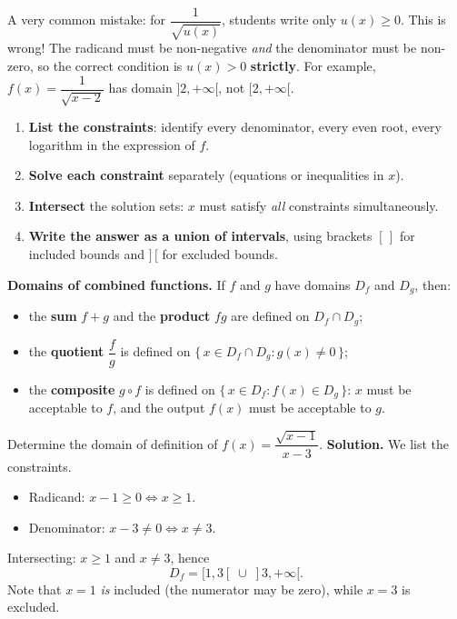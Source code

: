 \documentclass[11pt]{article}
\begin{document}
\begin{attention}
A very common mistake: for $\dfrac{1}{\sqrt{u(x)}}$, students write only $u(x) \geq 0$. This is wrong! The radicand must be non-negative \emph{and} the denominator must be non-zero, so the correct condition is $u(x) > 0$ \textbf{strictly}. For example, $f(x) = \dfrac{1}{\sqrt{x-2}}$ has domain $]2, +\infty[$, not $[2, +\infty[$.
\end{attention}

\begin{methode}
\begin{enumerate}
\item \textbf{List the constraints}: identify every denominator, every even root, every logarithm in the expression of $f$.
\item \textbf{Solve each constraint} separately (equations or inequalities in $x$).
\item \textbf{Intersect} the solution sets: $x$ must satisfy \emph{all} constraints simultaneously.
\item \textbf{Write the answer as a union of intervals}, using brackets $[\,]$ for included bounds and $]\,[$ for excluded bounds.
\end{enumerate}
\end{methode}

\textbf{Domains of combined functions.} If $f$ and $g$ have domains $D_f$ and $D_g$, then:
\begin{itemize}
\item the \textbf{sum} $f+g$ and the \textbf{product} $fg$ are defined on $D_f \cap D_g$;
\item the \textbf{quotient} $\dfrac{f}{g}$ is defined on $\{\, x \in D_f \cap D_g : g(x) \neq 0 \,\}$;
\item the \textbf{composite} $g \circ f$ is defined on $\{\, x \in D_f : f(x) \in D_g \,\}$: $x$ must be acceptable to $f$, and the output $f(x)$ must be acceptable to $g$.
\end{itemize}

\begin{exoresolu}
Determine the domain of definition of $f(x) = \dfrac{\sqrt{x-1}}{x-3}$.
\tcblower
\textbf{Solution.} We list the constraints.
\begin{itemize}
\item Radicand: $x - 1 \geq 0 \iff x \geq 1$.
\item Denominator: $x - 3 \neq 0 \iff x \neq 3$.
\end{itemize}
Intersecting: $x \geq 1$ and $x \neq 3$, hence
\[ D_f = [1, 3[ \;\cup\; ]3, +\infty[. \]
Note that $x = 1$ \emph{is} included (the numerator may be zero), while $x = 3$ is excluded.
\end{exoresolu}
\end{document}
